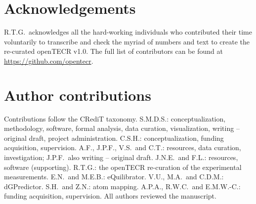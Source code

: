 \section{Acknowledgements} R.T.G.\ acknowledges all the hard-working individuals who contributed their time voluntarily to transcribe and check the myriad of numbers and text to create the re-curated openTECR v1.0. The full list of contributors can be found at \url{https://github.com/opentecr}.

\section{Author contributions} Contributions follow the CRediT taxonomy. S.M.D.S.: conceptualization, methodology, software, formal analysis, data curation, visualization, writing -- original draft, project administration. C.S.H.: conceptualization, funding acquisition, supervision. A.F., J.P.F., V.S.\ and C.T.: resources, data curation, investigation; J.P.F.\ also writing -- original draft. J.N.E.\ and F.L.: resources, software (supporting). R.T.G.: the openTECR re-curation of the experimental measurements. E.N.\ and M.E.B.: eQuilibrator. V.U., M.A.\ and C.D.M.: dGPredictor. S.H.\ and Z.N.: atom mapping. A.P.A., R.W.C.\ and E.M.W.-C.: funding acquisition, supervision. All authors reviewed the manuscript.

